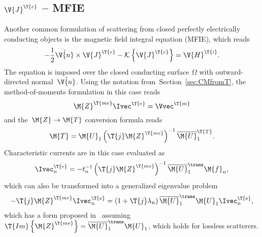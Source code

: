 \documentclass[journal]{IEEEtran}
\providecommand{\Je}{\V{J}^\T{e}} %
\providecommand{\Umat}{\M{U}} %
\providecommand{\Ie}{\Ivec^{\T{e}}} %
\providecommand{\Vm}{\Vvec^{\T{m}}} %
\providecommand{\Hi}{\V{H}^{\T{i}}} %
\begin{document}
\subsection{$\Je$ -- MFIE}
\label{sec:JMFIE}
Another common formulation of scattering from closed perfectly electrically conducting objects is the magnetic field integral equation (MFIE), which reads
\begin{equation}
\label{eq:JMFIE:App}
     - \dfrac{1}{2} \hat{\V{n}} \times \Je - \mathcal{K} \left\{ \Je \right\}  = \Hi.
\end{equation}
The equation is imposed over the closed conducting surface $\varOmega$ with outward-directed normal~$\hat{\V{n}}$. Using the notation from~Section~\ref{sec:CMfromT}, the method-of-moments formulation in this case reads
\begin{equation}
    \label{eq:MoMJMFIE}
    \M{Z}^\T{me} \Ie = \Vm
\end{equation}
and the~$\M{Z} \to \M{T}$ conversion formula reads
\begin{equation}
    \label{eq:MoMJMFIET}
   \M{T} =  \Umat_1 \left( \T{j}\M{Z}^\T{me} \right)^{-1} \overline{\Umat}_1^\T{T}.
\end{equation}
Characteristic currents are in this case evaluated as
\begin{equation}
    \Ie_n = - t_n^{-1} \left( \T{j}\M{Z}^\T{me} \right)^{-1} \overline{\Umat}_1^\trans \M{f}_n,
\end{equation}
which can also be transformed into a generalized eigenvalue problem
\begin{equation}
    -\T{j}\M{Z}^\T{me} \Ie_n = \left(1 + \T{j}\lambda_n \right) \overline{\Umat}_1^\trans \Umat_1 \Ie_n,
    \label{eq:app:MFIE:GEP}
\end{equation}
which has a form proposed in~\cite{DaiLiuGanChew_CFIEforCMs} assuming~$\T{Im} \left\{ \M{Z}^\T{me} \right\} = \overline{\Umat}_1^\trans \Umat_1$, which holds for lossless scatterers.
\end{document}
